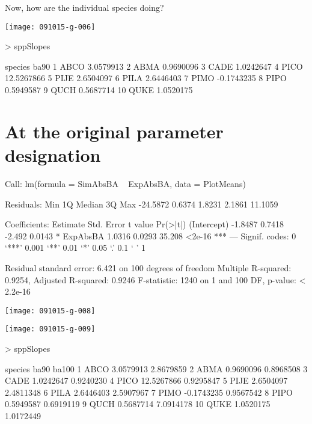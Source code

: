 \documentclass{article}
\begin{document}
Now, how are the individual species doing?

\texttt{[image: 091015-g-006]}
\begin{Schunk}
\begin{Sinput}
>   sppSlopes
\end{Sinput}
\begin{Soutput}
   species       ba90
1     ABCO  3.0579913
2     ABMA  0.9690096
3     CADE  1.0242647
4     PICO 12.5267866
5     PIJE  2.6504097
6     PILA  2.6446403
7     PIMO -0.1743235
8     PIPO  0.5949587
9     QUCH  0.5687714
10    QUKE  1.0520175
\end{Soutput}
\end{Schunk}


\newpage
\section{At the original parameter designation}
\begin{Schunk}
\begin{Soutput}
Call:
lm(formula = SimAbsBA ~ ExpAbsBA, data = PlotMeans)

Residuals:
     Min       1Q   Median       3Q      Max 
-24.5872   0.6374   1.8231   2.1861  11.1059 

Coefficients:
            Estimate Std. Error t value Pr(>|t|)    
(Intercept)  -1.8487     0.7418  -2.492   0.0143 *  
ExpAbsBA      1.0316     0.0293  35.208   <2e-16 ***
---
Signif. codes:  0 ‘***’ 0.001 ‘**’ 0.01 ‘*’ 0.05 ‘.’ 0.1 ‘ ’ 1

Residual standard error: 6.421 on 100 degrees of freedom
Multiple R-squared:  0.9254,	Adjusted R-squared:  0.9246 
F-statistic:  1240 on 1 and 100 DF,  p-value: < 2.2e-16
\end{Soutput}
\end{Schunk}
\texttt{[image: 091015-g-008]}

\texttt{[image: 091015-g-009]}
\begin{Schunk}
\begin{Sinput}
>   sppSlopes
\end{Sinput}
\begin{Soutput}
   species       ba90     ba100
1     ABCO  3.0579913 2.8679859
2     ABMA  0.9690096 0.8968508
3     CADE  1.0242647 0.9240230
4     PICO 12.5267866 0.9295847
5     PIJE  2.6504097 2.4811348
6     PILA  2.6446403 2.5907967
7     PIMO -0.1743235 0.9567542
8     PIPO  0.5949587 0.6919119
9     QUCH  0.5687714 7.0914178
10    QUKE  1.0520175 1.0172449
\end{Soutput}
\end{Schunk}
\end{document}
